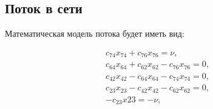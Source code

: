 \documentclass[a4paper,14pt,usenames,dvipsnames]{extreport}
\begin{document}
\subsection*{Поток в сети}
Математическая модель потока будет иметь вид:

\begin{gather*}
c_{74}x_{74} + c_{76}x_{76} = \nu,\\
c_{64}x_{64} + c_{62}x_{62} - c_{76}x_{76} = 0,\\
c_{42}x_{42} - c_{64}x_{64} - c_{74}x_{74} = 0, \\
c_{23}x_{23} - c_{42}x_{42} - c_{62}x_{62} = 0,\\
-c_{23}x{23} = -\nu,\\
\end{gather*}
\end{document}
